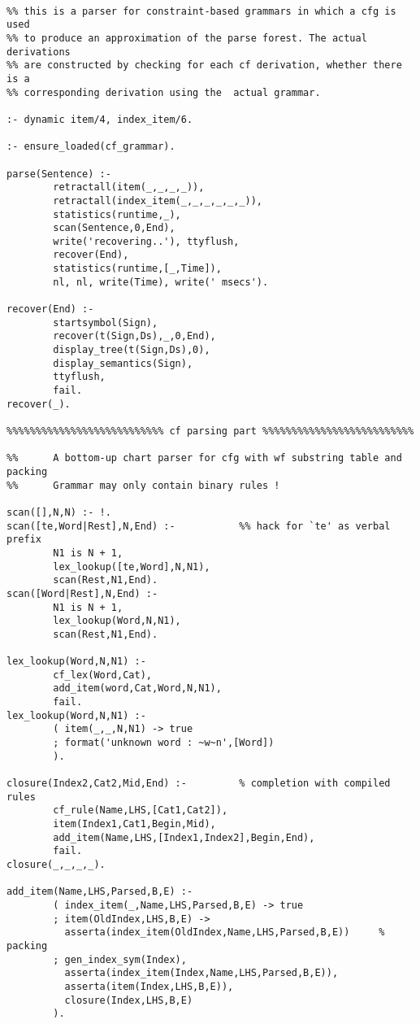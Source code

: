 \begin{verbatim}

%% this is a parser for constraint-based grammars in which a cfg is used
%% to produce an approximation of the parse forest. The actual derivations 
%% are constructed by checking for each cf derivation, whether there is a
%% corresponding derivation using the  actual grammar.

:- dynamic item/4, index_item/6.

:- ensure_loaded(cf_grammar).

parse(Sentence) :-
        retractall(item(_,_,_,_)), 
        retractall(index_item(_,_,_,_,_,_)),
        statistics(runtime,_),
        scan(Sentence,0,End),
        write('recovering..'), ttyflush,
        recover(End),
        statistics(runtime,[_,Time]),
        nl, nl, write(Time), write(' msecs').
        
recover(End) :-
        startsymbol(Sign),
        recover(t(Sign,Ds),_,0,End),
        display_tree(t(Sign,Ds),0),
        display_semantics(Sign),
        ttyflush,
        fail.
recover(_).

%%%%%%%%%%%%%%%%%%%%%%%%%%% cf parsing part %%%%%%%%%%%%%%%%%%%%%%%%%%

%%      A bottom-up chart parser for cfg with wf substring table and packing
%%      Grammar may only contain binary rules !

scan([],N,N) :- !.
scan([te,Word|Rest],N,End) :-           %% hack for `te' as verbal prefix 
        N1 is N + 1,
        lex_lookup([te,Word],N,N1),
        scan(Rest,N1,End).
scan([Word|Rest],N,End) :- 
        N1 is N + 1,
        lex_lookup(Word,N,N1),
        scan(Rest,N1,End).
        
lex_lookup(Word,N,N1) :-
        cf_lex(Word,Cat),
        add_item(word,Cat,Word,N,N1),
        fail.
lex_lookup(Word,N,N1) :-
        ( item(_,_,N,N1) -> true
        ; format('unknown word : ~w~n',[Word])
        ).

closure(Index2,Cat2,Mid,End) :-         % completion with compiled rules
        cf_rule(Name,LHS,[Cat1,Cat2]),
        item(Index1,Cat1,Begin,Mid),
        add_item(Name,LHS,[Index1,Index2],Begin,End),
        fail.
closure(_,_,_,_).
        
add_item(Name,LHS,Parsed,B,E) :-
        ( index_item(_,Name,LHS,Parsed,B,E) -> true             
        ; item(OldIndex,LHS,B,E) ->                             
          asserta(index_item(OldIndex,Name,LHS,Parsed,B,E))     % packing
        ; gen_index_sym(Index), 
          asserta(index_item(Index,Name,LHS,Parsed,B,E)),
          asserta(item(Index,LHS,B,E)),
          closure(Index,LHS,B,E)
        ).
        

\end{verbatim}
